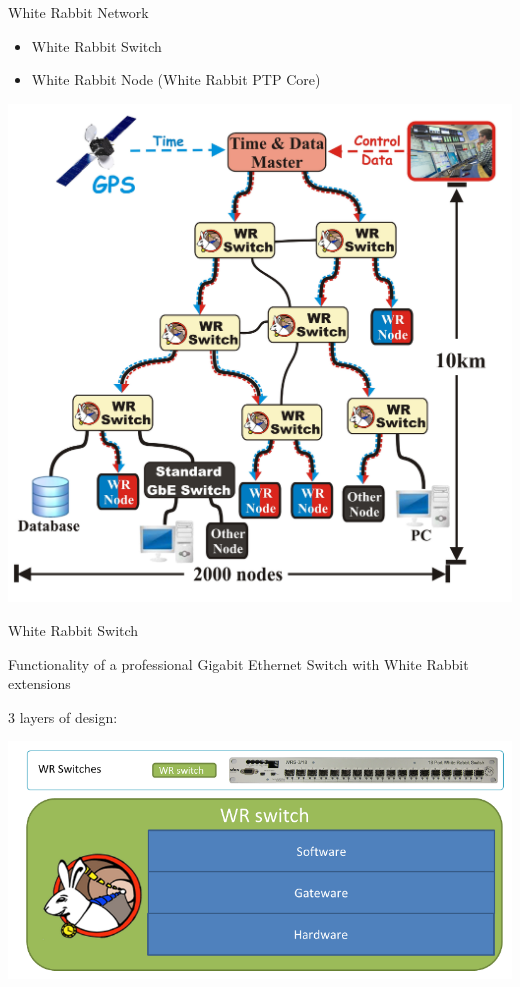 \documentclass[compress,red]{beamer}
\begin{document}
\begin{frame}{White Rabbit Network}
    \begin{itemize}
      \item White Rabbit Switch
      \item White Rabbit Node (White Rabbit PTP Core)
    \end{itemize}
    \begin{center}
    \includegraphics[width=.5\textwidth]{network/wr_network-enhanced_pro.pdf}
    \end{center}
\end{frame}

\begin{frame}{White Rabbit Switch}
	\begin{block}{Functionality of a professional Gigabit Ethernet Switch}
	with White Rabbit extensions
	\end{block}
	\begin{block}{3 layers of design:}
	\begin{center}
	\includegraphics[width=\textwidth]{switch/wrSwitch.png}
	\end{center}
	\end{block}
\end{frame}
\end{document}
